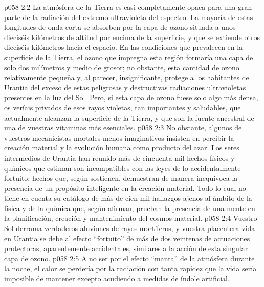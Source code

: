 \vs p058 2:2 \pc La atmósfera de la Tierra es casi completamente opaca para una gran parte de la radiación del extremo ultravioleta del espectro. La mayoría de estas longitudes de onda corta se absorben por la capa de ozono situada a unos dieciséis kilómetros de altitud por encima de la superficie, y que se extiende otros dieciséis kilómetros hacia el espacio. En las condiciones que prevalecen en la superficie de la Tierra, el ozono que impregna esta región formaría una capa de solo dos milímetros y medio de grosor; no obstante, esta cantidad de ozono relativamente pequeña y, al parecer, insignificante, protege a los habitantes de Urantia del exceso de estas peligrosas y destructivas radiaciones ultravioletas presentes en la luz del Sol. Pero, si esta capa de ozono fuese solo algo más densa, os veríais privados de esos rayos violetas, tan importantes y saludables, que actualmente alcanzan la superficie de la Tierra, y que son la fuente ancestral de una de vuestras vitaminas más esenciales.
\vs p058 2:3 No obstante, algunos de vuestros mecanicistas mortales menos imaginativos insisten en percibir la creación material y la evolución humana como producto del azar. Los seres intermedios de Urantia han reunido más de cincuenta mil hechos físicos y químicos que estiman son incompatibles con las leyes de lo accidentalmente fortuito; hechos que, según sostienen, demuestran de manera inequívoca la presencia de un propósito inteligente en la creación material. Todo lo cual no tiene en cuenta su catálogo de más de cien mil hallazgos ajenos al ámbito de la física y de la química que, según afirman, prueban la presencia de una mente en la planificación, creación y mantenimiento del cosmos material.
\vs p058 2:4 Vuestro Sol derrama verdaderos aluviones de rayos mortíferos, y vuestra placentera vida en Urantia se debe al efecto “fortuito” de más de dos veintenas de actuaciones protectoras, aparentemente accidentales, similares a la acción de esta singular capa de ozono.
\vs p058 2:5 A no ser por el efecto “manta” de la atmósfera durante la noche, el calor se perdería por la radiación con tanta rapidez que la vida sería imposible de mantener excepto acudiendo a medidas de índole artificial.
